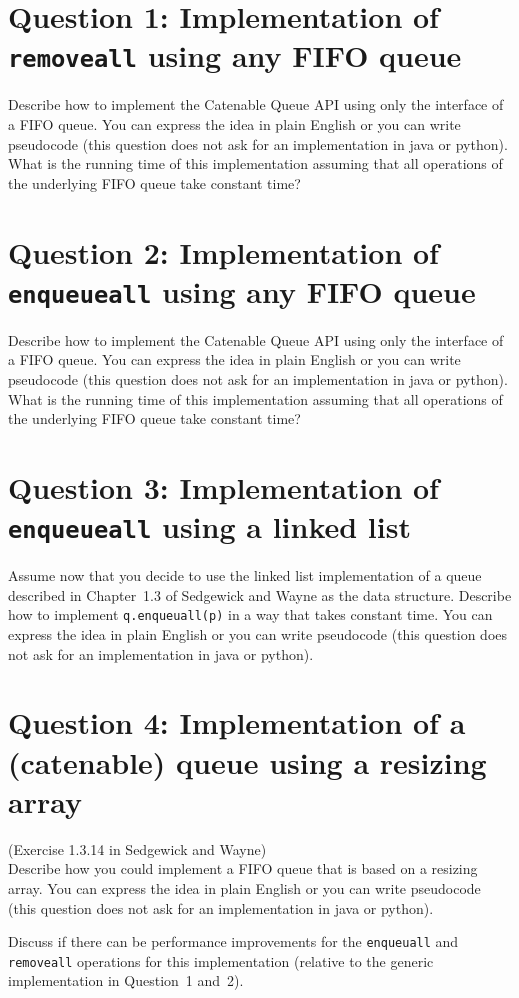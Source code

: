 \documentclass{tufte-handout}
\begin{document}
\section{\textbf{Question 1}: Implementation of \texttt{removeall} using any FIFO queue}

Describe how to implement the Catenable Queue API using only the interface of a FIFO queue.
You can express the idea in plain English or you can write pseudocode (this question does not ask for an implementation in java or python).
What is the running time of this implementation assuming that all operations of the underlying FIFO queue take constant time?

\section{\textbf{Question 2}: Implementation of \texttt{enqueueall} using any FIFO queue}


Describe how to implement the Catenable Queue API using only the interface of a FIFO queue.
You can express the idea in plain English or you can write pseudocode (this question does not ask for an implementation in java or python).
What is the running time of this implementation assuming that all operations of the underlying FIFO queue take constant time?

\section{\textbf{Question 3}: Implementation of \texttt{enqueueall} using a linked list}

Assume now that you decide to use the linked list implementation of a queue described in Chapter~1.3 of Sedgewick and Wayne as the data structure.
Describe how to implement \texttt{q.enqueuall(p)} in a way that takes constant time.
You can express the idea in plain English or you can write pseudocode (this question does not ask for an implementation in java or python).

\section{\textbf{Question 4}: Implementation of a (catenable) queue using a resizing array}


(Exercise 1.3.14 in Sedgewick and Wayne)\\
Describe how you could implement a FIFO queue that is based on a resizing array.
You can express the idea in plain English or you can write pseudocode (this question does not ask for an implementation in java or python).

Discuss if there can be performance improvements for the \texttt{enqueuall} and \texttt{removeall} operations for this implementation (relative to the generic implementation in Question~1 and~2).
\end{document}
